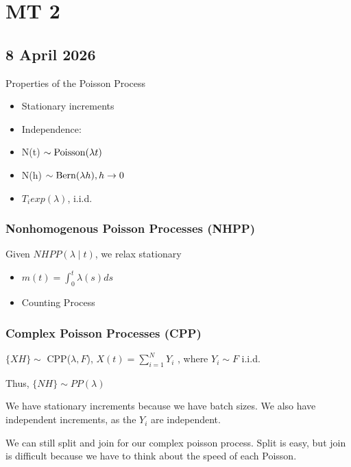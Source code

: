 \documentclass{report}
\begin{document}

\chapter{MT 2}
\section{8 April 2026}

Properties of the Poisson Process

\begin{itemize}
	\item Stationary increments
	\item Independence: 
	\item N(t) $ \sim \operatorname{Poisson}(\lambda t) $ 
	\item N(h) $ \sim \operatorname{Bern}(\lambda h), h \to 0  $ 
	\item $ T_{i} exp(\lambda) $, i.i.d.
\end{itemize}


\subsection{Nonhomogenous Poisson Processes (NHPP)}

Given $ NHPP(\lambda \mid t) $, we relax stationary 
\begin{itemize}
	\item $ m(t) = \int_{0}^{t} \lambda (s) ds  $ 
	\item Counting Process
\end{itemize}

\vspace{5mm}
\subsection{Complex Poisson Processes (CPP)}

$ \{XH\} \sim $ CPP($ \lambda, F $), $ X(t) = \sum_{i=1}^{N}Y_{i} $ , where $ Y_{i} \sim F $  i.i.d.

Thus, $ \{NH\} \sim PP(\lambda) $ 

We have stationary increments because we have batch sizes. We also have independent increments, as the $ Y_{i} $ are independent. 

We can still split and join for our complex poisson process. Split is easy, but join is difficult because we have to think about the speed of each Poisson.
\end{document}
